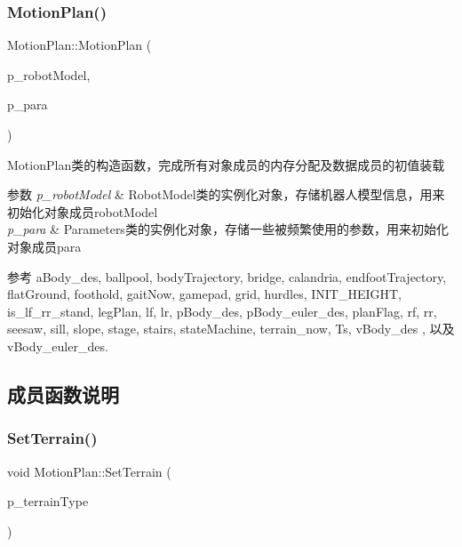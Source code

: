 \subsubsection{\texorpdfstring{Motion\+Plan()}{MotionPlan()}}
{\footnotesize\ttfamily Motion\+Plan\+::\+Motion\+Plan (\begin{DoxyParamCaption}\item[{\hyperlink{classquadruped_1_1RobotModel}{Robot\+Model} $\ast$}]{p\+\_\+robot\+Model,  }\item[{\hyperlink{classquadruped_1_1Parameters}{Parameters} $\ast$}]{p\+\_\+para }\end{DoxyParamCaption})\hspace{0.3cm}{\ttfamily [explicit]}}



Motion\+Plan类的构造函数，完成所有对象成员的内存分配及数据成员的初值装载 


\begin{DoxyParams}{参数}
{\em p\+\_\+robot\+Model} & Robot\+Model类的实例化对象，存储机器人模型信息，用来初始化对象成员robot\+Model \\
\hline
{\em p\+\_\+para} & Parameters类的实例化对象，存储一些被频繁使用的参数，用来初始化对象成员para \\
\hline
\end{DoxyParams}


参考 a\+Body\+\_\+des, ballpool, body\+Trajectory, bridge, calandria, endfoot\+Trajectory, flat\+Ground, foothold, gait\+Now, gamepad, grid, hurdles, I\+N\+I\+T\+\_\+\+H\+E\+I\+G\+HT, is\+\_\+lf\+\_\+rr\+\_\+stand, leg\+Plan, lf, lr, p\+Body\+\_\+des, p\+Body\+\_\+euler\+\_\+des, plan\+Flag, rf, rr, seesaw, sill, slope, stage, stairs, state\+Machine, terrain\+\_\+now, Ts, v\+Body\+\_\+des , 以及 v\+Body\+\_\+euler\+\_\+des.



\subsection{成员函数说明}
\mbox{\label{classquadruped_1_1MotionPlan_a46f0f22ad97c07959a86eb055778455e}} 
\subsubsection{\texorpdfstring{Set\+Terrain()}{SetTerrain()}}
{\footnotesize\ttfamily void Motion\+Plan\+::\+Set\+Terrain (\begin{DoxyParamCaption}\item[{uint8\+\_\+t}]{p\+\_\+terrain\+Type }\end{DoxyParamCaption})}



